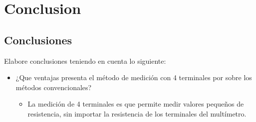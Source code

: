 \chapter{Conclusion}
\section{Conclusiones}
Elabore conclusiones teniendo en cuenta lo siguiente:
\begin{itemize}
  \item ¿Que ventajas presenta el método de medición con 4 terminales  por sobre los métodos convencionales?
    \begin{itemize}
      \item La medición de 4 terminales es que permite medir valores pequeños de resistencia, sin importar la resistencia de los terminales del multímetro.


\end{itemize}
\end{itemize}
